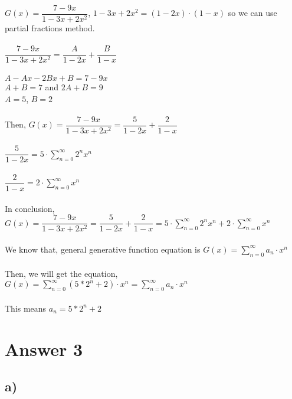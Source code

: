 \documentclass[12pt]{article}
\begin{document}
$G(x) =\dfrac{7-9x}{1-3x+2x^2}$, $1-3x+2x^2 = (1-2x)\cdot(1-x)$ so we can use partial fractions method.\\ 
\\
$\dfrac{7-9x}{1-3x+2x^2} = \dfrac{A}{1-2x} + \dfrac{B}{1-x}$\\
\\
$A - Ax - 2Bx + B = 7 - 9x$\\
$A + B = 7$ and $2A + B = 9$\\
$A = 5$, $B = 2$\\
\\
Then, $G(x) =\dfrac{7-9x}{1-3x+2x^2} = \dfrac{5}{1-2x} + \dfrac{2}{1-x}$\\
\\
$\dfrac{5}{1-2x} = 5 \cdot \sum^{\infty}_{n=0} 2^n x^n$\\
\\
$\dfrac{2}{1-x} = 2 \cdot \sum^{\infty}_{n=0} x^n$\\
\\
In conclusion, $G(x) =\dfrac{7-9x}{1-3x+2x^2} = \dfrac{5}{1-2x} + \dfrac{2}{1-x} = 5 \cdot \sum^{\infty}_{n=0} 2^n x^n + 2 \cdot \sum^{\infty}_{n=0} x^n$\\
\\
We know that, general generative function equation is $G(x) = \sum^{\infty}_{n=0} a_n \cdot x^n$\\
\\
Then, we will get the equation, $G(x) = \sum^{\infty}_{n=0} (5*2^n + 2) \cdot x^n = \sum^{\infty}_{n=0} a_n \cdot x^n$\\
\\
This means $a_n = 5*2^n + 2$\\

\section*{Answer 3}
\subsection*{a) }
\end{document}
